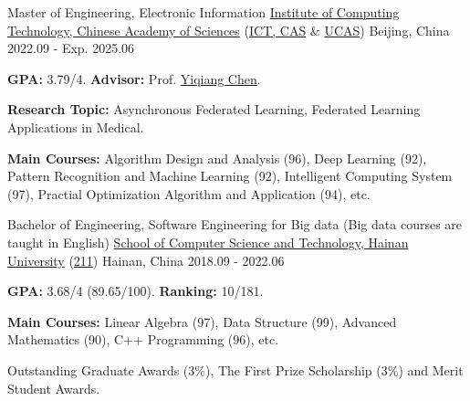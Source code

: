
\begin{cventries}

\cventry
{Master of Engineering, Electronic Information} %
{\href{http://www.ict.cas.cn/}{Institute of Computing Technology, Chinese Academy of Sciences} (\href{http://www.ict.cas.cn/}{ICT, CAS} \& \href{https://www.ucas.ac.cn/}{UCAS})} %
{Beijing, China} %
{2022.09 - Exp. 2025.06} %
{
  \begin{cvitems} %
    \item {\textbf{GPA:} 3.79/4. \textbf{Advisor:} Prof. \href{https://www.ict.cas.cn/sourcedb_ict_cas/cn/jssrck/200909/t20090917_2496596.html}{Yiqiang Chen}.}
    \item {\textbf{Research Topic:} Asynchronous Federated Learning, Federated Learning Applications in Medical.} %
    \item {\textbf{Main Courses:} Algorithm Design and Analysis (96), Deep Learning (92), Pattern Recognition and Machine Learning (92), Intelligent Computing System (97), Practial Optimization Algorithm and Application (94), etc.}
  \end{cvitems}
}

\cventry
{Bachelor of Engineering, Software Engineering for Big data (Big data courses are taught in English)} %
{\href{https://www.hainanu.edu.cn/}{School of Computer Science and Technology, Hainan University} (\href{https://en.wikipedia.org/wiki/Project_211}{211})} %
{Hainan, China} %
{2018.09 - 2022.06} %
{
  \begin{cvitems} %
    \item {\textbf{GPA:} 3.68/4 (89.65/100). \textbf{Ranking:} 10/181.} %
    \item {\textbf{Main Courses:} Linear Algebra (97), Data Structure (99), Advanced Mathematics (90), C++ Programming (96), etc.}
    \item {Outstanding Graduate Awards (3\%), The First Prize Scholarship (3\%) and Merit Student Awards.}
  \end{cvitems}
}

\end{cventries}
